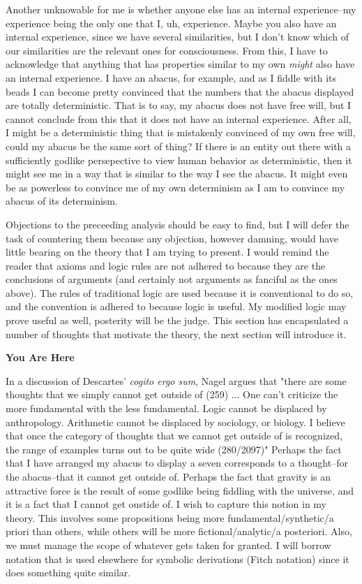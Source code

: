 \documentclass[12pt]{article}
\begin{document}
\begin{flushleft}
Another unknowable for me is whether anyone else has an internal experience--my experience being the only one that I, uh, experience\footnotemark.
Maybe you also have an internal experience, since we have several similarities, but I don't know which of our similarities are the relevant ones for consciousness.
From this, I have to acknowledge that anything that has properties similar to my own \textit{might} also have an internal experience.
I have an abacus, for example, and as I fiddle with its beads I can become pretty convinced that the numbers that the abacus displayed are totally deterministic.
That is to say, my abacus does not have free will, but I cannot conclude from this that it does not have an internal experience.
After all, I might be a deterministic thing that is mistakenly convinced of my own free will, could my abacus be the same sort of thing?
If there is an entity out there with a sufficiently godlike persepective to view human behavior as deterministic, then it might see me in a way that is similar to the way I see the abacus.
It might even be as powerless to convince me of my own determinism as I am to convince my abacus of its determinism.

Objections to the preceeding analysis should be easy to find, but I will defer the task of countering them because any objection, however damning, would have little bearing on the theory that I am trying to present.
I would remind the reader that axioms and logic rules are not adhered to because they are the conclusions of arguments (and certainly not arguments as fanciful as the ones above).
The rules of traditional logic are used because it is conventional to do so, and the convention is adhered to because logic is useful.
My modified logic may prove useful as well, posterity will be the judge.
This section has encapsulated a number of thoughts that motivate the theory, the next section will introduce it.

\setlength{\parindent}{0in}
\par\bigskip
\textbf{You Are Here}
\setlength{\parindent}{0.5in}

In a discussion of Descartes' \textit{cogito ergo sum}, Nagel argues that "there are some thoughts that we simply cannot get outside of (259) ... One can't criticize the more fundamental with the less fundamental.  Logic cannot be displaced by anthropology.  Arithmetic cannot be displaced by sociology, or biology.  I believe that once the category of thoughts that we cannot get outside of is recognized, the range of examples turns out to be quite wide (280/2097)"
Perhaps the fact that I have arranged my abacus to display a seven corresponds to a thought--for the abacus--that it cannot get outside of.
Perhaps the fact that gravity is an attractive force is the result of some godlike being fiddling with the universe, and it is a fact that I cannot get oustide of.
I wish to capture this notion in my theory.
This involves some propositions being more fundamental/synthetic/a priori than others, while others will be more fictional/analytic/a posteriori.
Also, we must manage the scope of whatever gets taken for granted.
I will borrow notation that is used elsewhere for symbolic derivations (Fitch notation) since it does something quite similar.


\end{flushleft}
\end{document}
